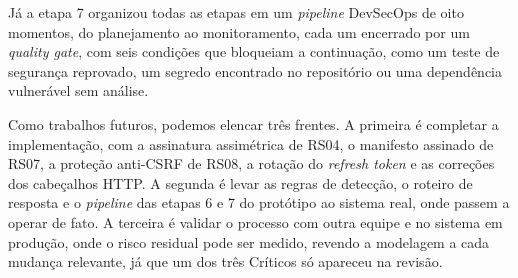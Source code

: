 \documentclass[conference]{IEEEtran}
\begin{document}
Já a etapa 7 organizou todas as etapas em um \textit{pipeline} DevSecOps de oito momentos, do planejamento ao monitoramento, cada um encerrado por um \textit{quality gate}, com seis condições que bloqueiam a continuação, como um teste de segurança reprovado, um segredo encontrado no repositório ou uma dependência vulnerável sem análise.

Como trabalhos futuros, podemos elencar três frentes. A primeira é completar a implementação, com a assinatura assimétrica de RS04, o manifesto assinado de RS07, a proteção anti-CSRF de RS08, a rotação do \textit{refresh token} e as correções dos cabeçalhos HTTP. A segunda é levar as regras de detecção, o roteiro de resposta e o \textit{pipeline} das etapas 6 e 7 do protótipo ao sistema real, onde passem a operar de fato. A terceira é validar o processo com outra equipe e no sistema em produção, onde o risco residual pode ser medido, revendo a modelagem a cada mudança relevante, já que um dos três Críticos só apareceu na revisão.



\end{document}

